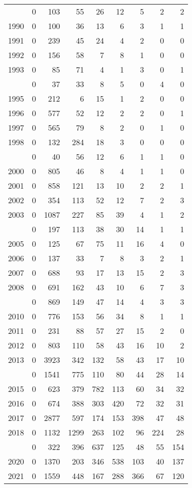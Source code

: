 \documentclass[
]{article}
\begin{document}
\begin{longtable}[t]{lrrrrrrrr}
\endfoot
\bottomrule
\endlastfoot
1989 & 0 & 103 & 55 & 26 & 12 & 5 & 2 & 2\\
1990 & 0 & 100 & 36 & 13 & 6 & 3 & 1 & 1\\
1991 & 0 & 239 & 45 & 24 & 4 & 2 & 0 & 0\\
1992 & 0 & 156 & 58 & 7 & 8 & 1 & 0 & 0\\
1993 & 0 & 85 & 71 & 4 & 1 & 3 & 0 & 1\\
\addlinespace
1994 & 0 & 37 & 33 & 8 & 5 & 0 & 4 & 0\\
1995 & 0 & 212 & 6 & 15 & 1 & 2 & 0 & 0\\
1996 & 0 & 577 & 52 & 12 & 2 & 2 & 0 & 1\\
1997 & 0 & 565 & 79 & 8 & 2 & 0 & 1 & 0\\
1998 & 0 & 132 & 284 & 18 & 3 & 0 & 0 & 0\\
\addlinespace
1999 & 0 & 40 & 56 & 12 & 6 & 1 & 1 & 0\\
2000 & 0 & 805 & 46 & 8 & 4 & 1 & 1 & 0\\
2001 & 0 & 858 & 121 & 13 & 10 & 2 & 2 & 1\\
2002 & 0 & 354 & 113 & 52 & 12 & 7 & 2 & 3\\
2003 & 0 & 1087 & 227 & 85 & 39 & 4 & 1 & 2\\
\addlinespace
2004 & 0 & 197 & 113 & 38 & 30 & 14 & 1 & 1\\
2005 & 0 & 125 & 67 & 75 & 11 & 16 & 4 & 0\\
2006 & 0 & 137 & 33 & 7 & 8 & 3 & 2 & 1\\
2007 & 0 & 688 & 93 & 17 & 13 & 15 & 2 & 3\\
2008 & 0 & 691 & 162 & 43 & 10 & 6 & 7 & 3\\
\addlinespace
2009 & 0 & 869 & 149 & 47 & 14 & 4 & 3 & 3\\
2010 & 0 & 776 & 153 & 56 & 34 & 8 & 1 & 1\\
2011 & 0 & 231 & 88 & 57 & 27 & 15 & 2 & 0\\
2012 & 0 & 803 & 110 & 58 & 43 & 16 & 10 & 2\\
2013 & 0 & 3923 & 342 & 132 & 58 & 43 & 17 & 10\\
\addlinespace
2014 & 0 & 1541 & 775 & 110 & 80 & 44 & 28 & 14\\
2015 & 0 & 623 & 379 & 782 & 113 & 60 & 34 & 32\\
2016 & 0 & 674 & 388 & 303 & 420 & 72 & 32 & 31\\
2017 & 0 & 2877 & 597 & 174 & 153 & 398 & 47 & 48\\
2018 & 0 & 1132 & 1299 & 263 & 102 & 96 & 224 & 28\\
\addlinespace
2019 & 0 & 322 & 396 & 637 & 125 & 48 & 55 & 154\\
2020 & 0 & 1370 & 203 & 346 & 538 & 103 & 40 & 137\\
2021 & 0 & 1559 & 448 & 167 & 288 & 366 & 67 & 120\\*
\end{longtable}
\end{document}
